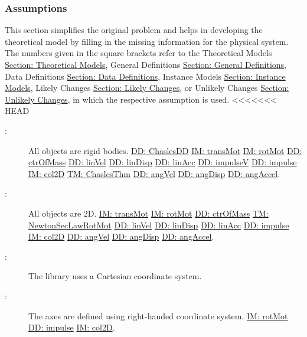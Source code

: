 \documentclass[12pt]{article}
\begin{document}
\subsubsection{Assumptions}
\label{Sec:Assumps}
This section simplifies the original problem and helps in developing the theoretical model by filling in the missing information for the physical system. The numbers given in the square brackets refer to the Theoretical Models \hyperref[Sec:TMs]{Section: Theoretical Models}, General Definitions \hyperref[Sec:GDs]{Section: General Definitions}, Data Definitions \hyperref[Sec:DDs]{Section: Data Definitions}, Instance Models \hyperref[Sec:IMs]{Section: Instance Models}, Likely Changes \hyperref[Sec:LCs]{Section: Likely Changes}, or Unlikely Changes \hyperref[Sec:UCs]{Section: Unlikely Changes}, in which the respective assumption is used.
<<<<<<< HEAD
\begin{description}
\item[\atheassumpnum\label{A:objectTy}:]All objects are rigid bodies. \hyperref[DD:ChaslesDD]{DD: ChaslesDD} \hyperref[IM:transMot]{IM: transMot} \hyperref[IM:rotMot]{IM: rotMot} \hyperref[DD:ctrOfMass]{DD: ctrOfMass} \hyperref[DD:linVel]{DD: linVel} \hyperref[DD:linDisp]{DD: linDisp} \hyperref[DD:linAcc]{DD: linAcc} \hyperref[DD:impulseV]{DD: impulseV} \hyperref[DD:impulse]{DD: impulse} \hyperref[IM:col2D]{IM: col2D} \hyperref[TM:ChaslesThm]{TM: ChaslesThm} \hyperref[DD:angVel]{DD: angVel} \hyperref[DD:angDisp]{DD: angDisp} \hyperref[DD:angAccel]{DD: angAccel}.
\end{description}
\begin{description}
\item[\atheassumpnum\label{A:objectDimension}:]All objects are 2D. \hyperref[IM:transMot]{IM: transMot} \hyperref[IM:rotMot]{IM: rotMot} \hyperref[DD:ctrOfMass]{DD: ctrOfMass} \hyperref[TM:NewtonSecLawRotMot]{TM: NewtonSecLawRotMot} \hyperref[DD:linVel]{DD: linVel} \hyperref[DD:linDisp]{DD: linDisp} \hyperref[DD:linAcc]{DD: linAcc} \hyperref[DD:impulse]{DD: impulse} \hyperref[IM:col2D]{IM: col2D} \hyperref[DD:angVel]{DD: angVel} \hyperref[DD:angDisp]{DD: angDisp} \hyperref[DD:angAccel]{DD: angAccel}.
\end{description}
\begin{description}
\item[\atheassumpnum\label{A:coordinateSystemTy}:]The library uses a Cartesian coordinate system.
\end{description}
\begin{description}
\item[\atheassumpnum\label{A:axesDefined}:]The axes are defined using right-handed coordinate system. \hyperref[IM:rotMot]{IM: rotMot} \hyperref[DD:impulse]{DD: impulse} \hyperref[IM:col2D]{IM: col2D}.
\end{description}
\end{document}
